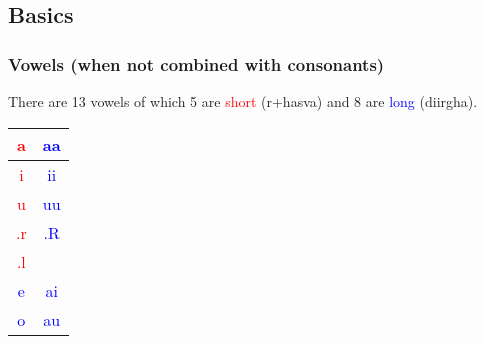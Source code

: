 \documentclass[a4paper, 12pt]{article}
\newcommand \sansletter[1]{
    \fontsize{1in}{1.2in}\selectfont 
    #1
}
\newcommand \eng[1]{
    \textenglish{#1}
}
\newcommand \shortsansletter[1]{
    \textcolor{red}{\sansletter{#1}}
}
\newcommand \longsansletter[1]{
    \textcolor{blue}{\sansletter{#1}}
}
\begin{document}
\subsection{\eng{Basics}}
\subsubsection{\eng{Vowels (when not combined with consonants)}}
\eng{
    There are 13 vowels of which 5 are \textcolor{red}{short} (\textsanskrit{r+hasva}) and 8 are \textcolor{blue}{long} (\textsanskrit{diirgha}).
}
\begin{center}
\begin{tabular}{|c|c|}
\hline
    \shortsansletter{a} &
    \longsansletter{aa}\\ 
    \hline
    \shortsansletter{i} &
    \longsansletter{ii} \\
    \hline
    \shortsansletter{u} &
    \longsansletter{uu} \\
    \hline
    \shortsansletter{.r} &
    \longsansletter{.R}\\
    \hline
    \shortsansletter{.l} &
    \sansletter{ }\\
    \hline
    \longsansletter{e} &
    \longsansletter{ai}\\
    \hline
    \longsansletter{o} &
    \longsansletter{au}\\
\hline
\end{tabular}
\end{center}
\end{document}
